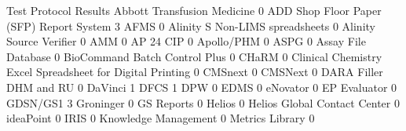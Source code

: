 \documentclass{article}
\begin{document}
\begin{Schunk}
\begin{Soutput}
                                                            Test Protocol Results
  Abbott Transfusion Medicine                                                   0
  ADD Shop Floor Paper (SFP) Report System                                      3
  AFMS                                                                          0
  Alinity S Non-LIMS spreadsheets                                               0
  Alinity Source Verifier                                                       0
  AMM                                                                           0
  AP 24 CIP                                                                     0
  Apollo/PHM                                                                    0
  ASPG                                                                          0
  Assay File Database                                                           0
  BioCommand Batch Control Plus                                                 0
  CHaRM                                                                         0
  Clinical Chemistry Excel Spreadsheet for Digital Printing                     0
  CMSnext                                                                       0
  CMSNext                                                                       0
  DARA Filler DHM and RU                                                        0
  DaVinci                                                                       1
  DFCS                                                                          1
  DPW                                                                           0
  EDMS                                                                          0
  eNovator                                                                      0
  EP Evaluator                                                                  0
  GDSN/GS1                                                                      3
  Groninger                                                                     0
  GS Reports                                                                    0
  Helios                                                                        0
  Helios Global Contact Center                                                  0
  ideaPoint                                                                     0
  IRIS                                                                          0
  Knowledge Management                                                          0
  Metrics Library                                                               0

\end{Soutput}
\end{Schunk}
\end{document}
